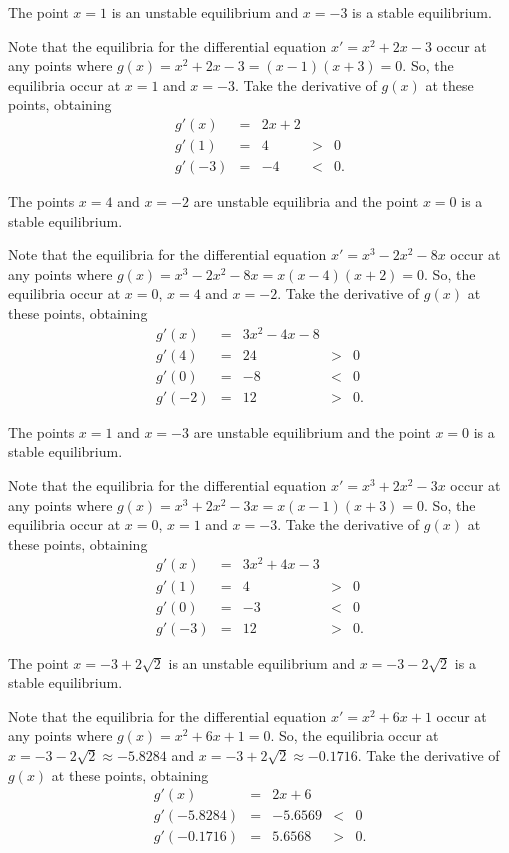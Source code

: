 \documentclass{ximera}
\begin{document}
\ans The point $x = 1$ is an unstable equilibrium and $x = -3$ is a stable
equilibrium.

\soln Note that the equilibria for the differential equation
$x' = x^2 + 2x - 3$ occur at any points where
$g(x) = x^2 + 2x - 3 = (x - 1)(x + 3) = 0$.
So, the equilibria occur at $x = 1$ and $x = -3$.  Take the
derivative of $g(x)$ at these points, obtaining
\[
\begin{array}{rcccl}
g'(x) & = & 2x + 2 \\
g'(1) & = & 4 & > & 0 \\
g'(-3) & = & -4 & < & 0.\end{array}
\]


\ans The points $x=4$ and $x = -2$ are unstable equilibria and the point 
$x = 0$ is a stable equilibrium.

\soln Note that the equilibria for the differential equation
$x' = x^3 - 2x^2 - 8x$ occur at any points where
$g(x) = x^3 - 2x^2 - 8x = x(x - 4)(x + 2) = 0$.
So, the equilibria occur at $x=0$, $x = 4$ and $x = -2$.  Take the
derivative of $g(x)$ at these points, obtaining
\[
\begin{array}{rcccl}
g'(x) & = & 3x^2-4x-8 \\
g'(4) & = & 24 & > & 0 \\
g'(0) & = & -8 & < & 0\\
g'(-2) & = & 12 & > & 0.\end{array}
\]

\ans The points $x=1$ and $x = -3$ are unstable equilibrium and the point 
$x = 0$ is a stable equilibrium.

\soln Note that the equilibria for the differential equation
$x' = x^3 + 2x^2 - 3x$ occur at any points where
$g(x) = x^3 + 2x^2 - 3x = x(x - 1)(x + 3) = 0$.
So, the equilibria occur at $x=0$, $x = 1$ and $x = -3$.  Take the
derivative of $g(x)$ at these points, obtaining
\[
\begin{array}{rcccl}
g'(x) & = & 3x^2+4x-3 \\
g'(1) & = & 4 & > & 0 \\
g'(0) & = & -3 & < & 0\\
g'(-3) & = & 12 & > & 0.\end{array}
\]

\ans The point $x = -3+2\sqrt{2}$ is an unstable equilibrium and 
$x = -3-2\sqrt{2}$ is a stable equilibrium.

\soln Note that the equilibria for the differential equation
$x' = x^2 + 6x + 1$ occur at any points where
$g(x) = x^2 + 6x + 1 = 0$.  So, the equilibria occur at $x =
-3-2\sqrt{2}\approx -5.8284$ and $x = -3+2\sqrt{2}\approx -0.1716$.  Take the
derivative of $g(x)$ at these points, obtaining
\[
\begin{array}{rcccl}
g'(x) & = & 2x + 6 \\
g'(-5.8284) & = & -5.6569 & < & 0 \\
g'(-0.1716) & = & 5.6568 & > & 0.\end{array}
\]
\end{document}
